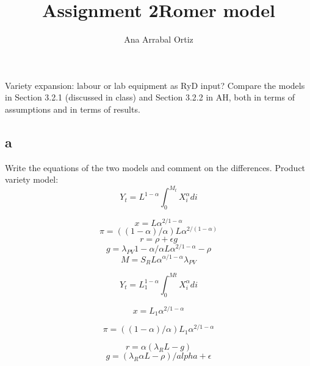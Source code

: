 \documentclass{article}
\begin{document}
\title{Assignment 2}
\author{Ana Arrabal Ortiz}

\begin{paragraph} Variety expansion: labour or lab equipment as RyD input?
Compare the models in Section 3.2.1 (discussed in class) and Section 3.2.2 in AH, both in terms of assumptions and in terms of results.
\end{paragraph}
 
\subsection{a}
Write the equations of the two models and comment on the differences.
    Product variety model: 
    \begin{equation}
    Y_{t}= L^{1-\alpha}\int_{0}^{M_{t}} X_{i}^{\alpha} di    
    \end{equation}
 
      \begin{equation}
      x = L\alpha^{2/1-\alpha}  
       \end{equation}
     \begin{equation}
    \pi= ((1-\alpha)/\alpha) L\alpha^{2/(1-\alpha)} 
     \end{equation}
     \begin{equation}
  r = \rho+\epsilon g
  \end{equation}
  \begin{equation}
 g=\lambda_{PV}1-\alpha/\alpha L\alpha^{2/1-\alpha}-\rho 
 \end{equation}
 \begin{equation}
 M = S_{R}L\alpha^{\alpha/1-\alpha}\lambda_{PV} 
  \end{equation}
 

  \title{Romer model}
 
 \begin{equation} 
 Y_{t} = L_{1}^{1-\alpha} \int_{0}^{M{t}} X_{i}^{\alpha}di
 \end{equation}
 
   \begin{equation} 
    x = L_{1}\alpha^{2/1-\alpha}
    \end{equation}
    
    \begin{equation} 
    \pi = ((1-\alpha)/\alpha) L_{1}\alpha^{2/1-\alpha}
    \end{equation}
    
    \begin{equation} 
    r= \alpha(\lambda_{R} L-g)
     \end{equation}
     \begin{equation} 
     g=(\lambda_{R}\alpha L-\rho)/alpha+\epsilon
     \end{equation}
 
\end{document}
